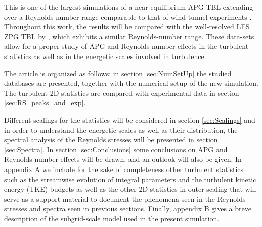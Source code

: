 This is one of the largest simulations of a near-equilibrium APG TBL extending over a Reynolds-number range comparable to that of wind-tunnel experiments \citep{MTL_expSANMIGUEL}. 
Throughout this work, the results will be compared with the well-resolved LES ZPG TBL by \cite{E-AmorZPG}, which exhibits a similar Reynolds-number range. These data-sets allow for a proper study of APG and Reynolds-number effects in the turbulent statistics as well as in the energetic scales involved in turbulence.

The article is organized as follows: in section \ref{sec:NumSetUp} the studied databases are presented, together with the numerical setup of the new simulation. 
The turbulent 2D statistics are compared with experimental data in section \ref{sec:RS_peaks_and_exp}.

Different scalings for the statistics will be considered in section \ref{sec:Scalings} and in order to understand the energetic scales as well as their distribution, the spectral analysis of the Reynolds stresses will be presented in section \ref{sec:Spectra}. 
In section \ref{sec:Conclusions} some conclusions on APG and Reynolds-number effects will be drawn, and an outlook will also be given. In appendix \hyperlink{AppA}{A} we include for the sake of completeness other turbulent statistics such as the streamwise evolution of integral parameters and the turbulent kinetic energy (TKE) budgets as well as the other 2D statistics in outer scaling that will serve as a support material to document the phenomena seen in the Reynolds stresses and spectra seen in previous sections.
Finally, appendix \hyperlink{AppB}{B} gives a breve description of the subgrid-scale model used in the present simulation.
